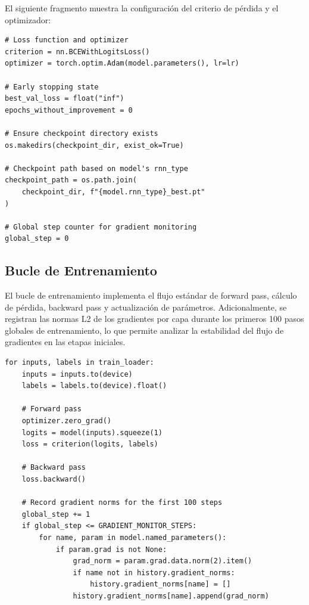 El siguiente fragmento muestra la configuración del criterio de pérdida y el optimizador:

\begin{verbatim}
# Loss function and optimizer
criterion = nn.BCEWithLogitsLoss()
optimizer = torch.optim.Adam(model.parameters(), lr=lr)

# Early stopping state
best_val_loss = float("inf")
epochs_without_improvement = 0

# Ensure checkpoint directory exists
os.makedirs(checkpoint_dir, exist_ok=True)

# Checkpoint path based on model's rnn_type
checkpoint_path = os.path.join(
    checkpoint_dir, f"{model.rnn_type}_best.pt"
)

# Global step counter for gradient monitoring
global_step = 0
\end{verbatim}

\subsection{Bucle de Entrenamiento}

El bucle de entrenamiento implementa el flujo estándar de forward pass, cálculo de pérdida,
backward pass y actualización de parámetros. Adicionalmente, se registran las normas L2 de
los gradientes por capa durante los primeros 100 pasos globales de entrenamiento, lo que
permite analizar la estabilidad del flujo de gradientes en las etapas iniciales.

\begin{verbatim}
for inputs, labels in train_loader:
    inputs = inputs.to(device)
    labels = labels.to(device).float()

    # Forward pass
    optimizer.zero_grad()
    logits = model(inputs).squeeze(1)
    loss = criterion(logits, labels)

    # Backward pass
    loss.backward()

    # Record gradient norms for the first 100 steps
    global_step += 1
    if global_step <= GRADIENT_MONITOR_STEPS:
        for name, param in model.named_parameters():
            if param.grad is not None:
                grad_norm = param.grad.data.norm(2).item()
                if name not in history.gradient_norms:
                    history.gradient_norms[name] = []
                history.gradient_norms[name].append(grad_norm)
\end{verbatim}

